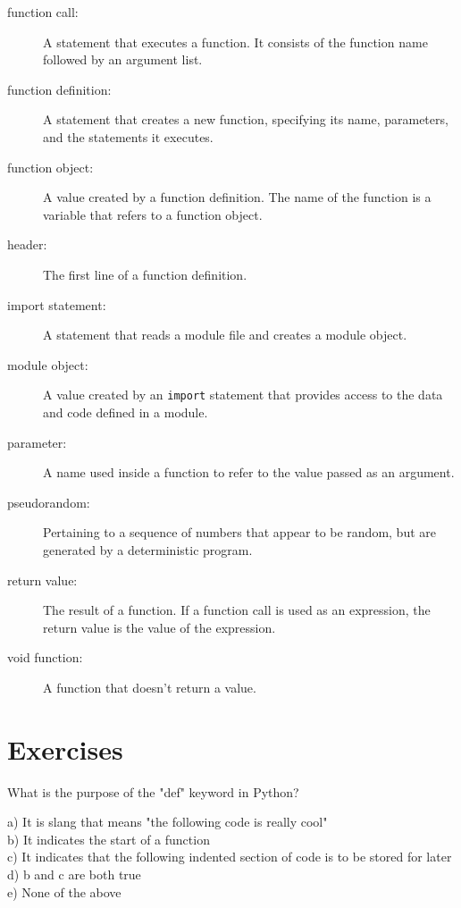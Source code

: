 \begin{description}
\item[function call:] A statement that executes a function. It
consists of the function name followed by an argument list.

\item[function definition:]  A statement that creates a new function,
specifying its name, parameters, and the statements it executes.

\item[function object:]  A value created by a function definition.
The name of the function is a variable that refers to a function
object.

\item[header:] The first line of a function definition.

\item[import statement:] A statement that reads a module file and creates
a module object.

\item[module object:] A value created by an {\tt import} statement
that provides access to the data and code defined in a module.

\item[parameter:] A name used inside a function to refer to the value
passed as an argument.

\item[pseudorandom:] Pertaining to a sequence of numbers that appear
to be random, but are generated by a deterministic program.

\item[return value:]  The result of a function.  If a function call
is used as an expression, the return value is the value of
the expression.

\item[void function:] A function that doesn't return a value.


\end{description}


\section{Exercises}

\begin{ex}
What is the purpose of the "def" keyword in Python?

a) It is slang that means "the following code is really cool"\\
b) It indicates the start of a function\\
c) It indicates that the following indented section of code is to be stored for later\\
d) b and c are both true\\
e) None of the above
\end{ex}

